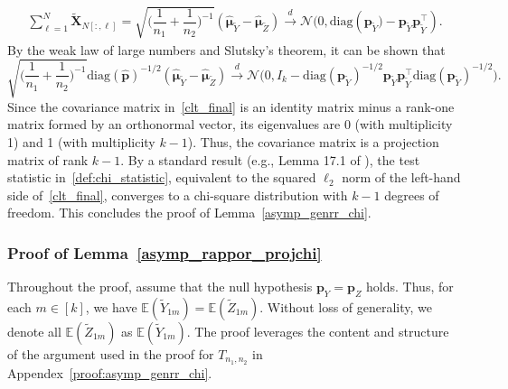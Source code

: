 \documentclass[twoside,11pt]{article}
\newcommand{\rvTwo}{Y}
\newcommand{\rvThree}{Z}
\newcommand{\vectorize}[1]{\mathbf{#1}}
\newcommand{\rvX}{X} %
\newcommand{\rVecX}{\vectorize{\rvX}}
\newcommand{\rvY}{Y}
\newcommand{\rvZ}{Z}
\newcommand{\mE}{\mathbb{E}} %
\newcommand{\alphabetSize}{k} %
\newcommand{\vectorIndex}{m}
\newcommand{\sampleSize}{n}
\newcommand{\probVec}{\mathbf{p}} %
\begin{document}
\begin{appendix}
\begin{align*}
		\sum_{\ell=1}^N \tilde{\rVecX}_{N[:,\ell]} = 
		\sqrt{\biggl( \dfrac{1}{\sampleSize_1}+\dfrac{1}{\sampleSize_2} \biggr)^{-1}}
		(\hat{\mathbf{\mu}}_{ \tilde{\rvY} }
		-
		\hat{\mathbf{\mu}}_{ \tilde{\rvZ} }
		)
		\stackrel{d}{\to}
		\mathcal{N}
		\bigl(0, \text{diag}(\probVec_{\tilde{\rvTwo}}
		\bigr) - \probVec_{\tilde{\rvTwo}} \probVec_{\tilde{\rvTwo}}^\top	).
	\end{align*}
	By the weak law of large numbers and Slutsky's theorem, it can be shown that
	\begin{equation}\label{clt_final}
		\sqrt{\biggl( \dfrac{1}{\sampleSize_1}+\dfrac{1}{\sampleSize_2} \biggr)^{-1}}
		\mathrm{diag}(\hat{\probVec})^{-1/2}
		(\hat{\mathbf{\mu}}_{ \tilde{\rvY} }
		-
		\hat{\mathbf{\mu}}_{ \tilde{\rvZ} }
		)
		\stackrel{d}{\to}
		\mathcal{N}
		\bigl(
		0,
		I_\alphabetSize - 
		\mathrm{diag}(\probVec_{\tilde{\rvTwo}})^{-1/2}
		\probVec_{\tilde{\rvTwo}} \probVec_{\tilde{\rvTwo}}^\top
		\mathrm{diag}(\probVec_{\tilde{\rvTwo}})^{-1/2}
		\bigr).
	\end{equation}
	Since the covariance matrix in~\eqref{clt_final} is an identity matrix minus a rank-one matrix formed by an orthonormal vector, its eigenvalues are 0 (with multiplicity 1) and 1 (with multiplicity $\alphabetSize-1$). Thus, the covariance matrix is a projection matrix of rank $k-1$. By a standard result (e.g., Lemma 17.1 of \citet{van_der_vaart_asymptotic_1998}), the test statistic in~\eqref{def:chi_statistic}, equivalent to the squared $\ell_2$ norm of the left-hand side of~\eqref{clt_final}, converges to a chi-square distribution with $\alphabetSize - 1$ degrees of freedom.
	This concludes the proof of Lemma~\ref{asymp_genrr_chi}.
	\subsubsection{Proof of Lemma~\ref{asymp_rappor_projchi}}\label{proof:asymp_rappor_projchi}
	\medskip 
	Throughout the proof, assume that the null hypothesis $\probVec_{\rvTwo} = \probVec_{\rvZ}$ holds. Thus, for each $\vectorIndex \in [\alphabetSize]$, we have $\mE(\tilde{\rvTwo}_{1\vectorIndex}) = \mE(\tilde{\rvThree}_{1\vectorIndex})$. Without loss of generality, we  denote all $\mE(\tilde{\rvThree}_{1\vectorIndex})$ as $\mE(\tilde{\rvTwo}_{1\vectorIndex})$.
	The proof leverages the content and structure of the argument used in the proof for $T_{\sampleSize_1, \sampleSize_2}$ in Appendex~\ref{proof:asymp_genrr_chi}.
	

\end{appendix}
\end{document}
